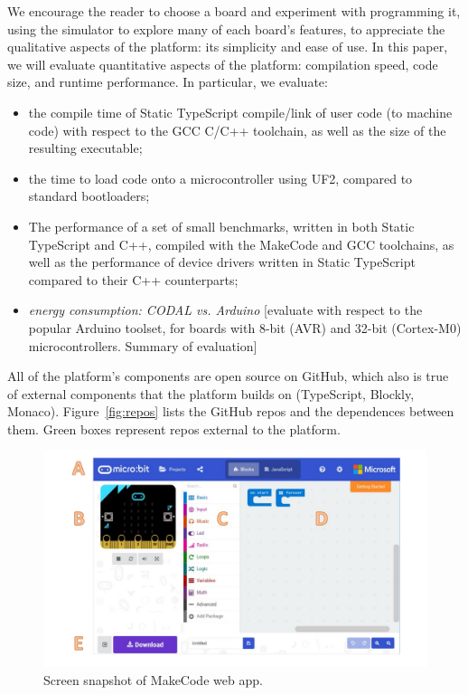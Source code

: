 We encourage the reader to choose a board and experiment with programming it, using the simulator to explore many 
of each board's features, to appreciate the qualitative aspects of the platform: its simplicity and ease of use.  In this 
paper, we will evaluate quantitative aspects of the platform: 
compilation speed, code size, and runtime performance.  In particular, we evaluate:
\begin{itemize}
\item the compile time of Static TypeScript compile/link of user code (to machine code) with respect 
      to the GCC C/C++ toolchain, as well as the size of the resulting executable;
\item the time to load code onto a microcontroller using UF2, compared to standard bootloaders; 
\item The performance of a set of small benchmarks, written in both Static TypeScript and C++,
      compiled with the MakeCode and GCC toolchains, as well as the performance of device drivers
      written in Static TypeScript compared to their C++ counterparts;
\item \emph{energy consumption: CODAL vs. Arduino}
[evaluate with respect to the popular Arduino toolset, for boards with 8-bit (AVR) and 32-bit (Cortex-M0) microcontrollers. 
Summary of evaluation]
\end{itemize}

All of the platform's components are open source on GitHub, 
which also is true of external components that the platform
builds on (TypeScript, Blockly, Monaco). Figure~\ref{fig:repos}
lists the GitHub repos and the dependences between them. Green
boxes represent repos external to the platform.

\begin{figure}[t]
      \includegraphics[width=5in]{screenSnapFig.pdf}
  \caption{\label{fig:screenSnap}Screen snapshot of MakeCode web app.}
\end{figure}

